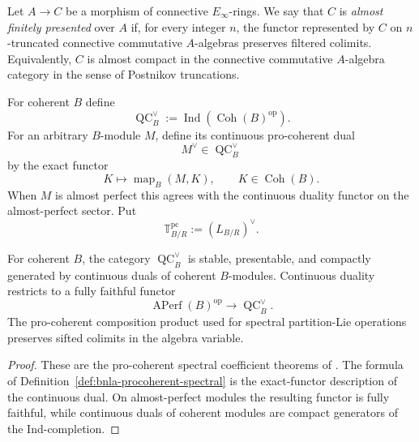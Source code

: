 \begin{definition}
\label{def:bnla-spectral-almost-finite-presentation}
Let $A\to C$ be a morphism of connective $E_\infty$-rings.  We say that
$C$ is \emph{almost finitely presented} over $A$ if, for every integer $n$,
the functor represented by $C$ on $n$-truncated connective commutative
$A$-algebras preserves filtered colimits.  Equivalently, $C$ is almost
compact in the connective commutative $A$-algebra category in the sense of
Postnikov truncations.  \end{definition}

\begin{definition}
\label{def:bnla-procoherent-spectral}
For coherent $B$ define
\[
    \operatorname{QC}^{\vee}_B
    :=
    \operatorname{Ind}
    \left(
        \operatorname{Coh}(B)^{\mathrm{op}}
    \right).
\]
For an arbitrary $B$-module $M$, define its continuous pro-coherent dual
\[
    M^\vee\in\operatorname{QC}^{\vee}_B
\]
by the exact functor
\[
    K\longmapsto
    \operatorname{map}_{B}(M,K),
    \qquad
    K\in\operatorname{Coh}(B).
\]
When $M$ is almost perfect this agrees with the continuous duality functor on
the almost-perfect sector.  Put
\[
    \mathbb T^{\mathrm{pc}}_{B/R}
    :=
    \left(L_{B/R}\right)^\vee.
\]
\end{definition}

\begin{proposition}
\label{prop:bnla-procoherent-properties}
For coherent $B$, the category $\operatorname{QC}^{\vee}_B$ is stable,
presentable, and compactly generated by continuous duals of coherent
$B$-modules.  Continuous duality restricts to a fully faithful functor
\[
    \operatorname{APerf}(B)^{\mathrm{op}}
    \longrightarrow
    \operatorname{QC}^{\vee}_B.
\]
The pro-coherent composition product used for spectral partition-Lie
operations preserves sifted colimits in the algebra variable.
\end{proposition}

\begin{proof}
These are the pro-coherent spectral coefficient theorems of
\cite{BrantnerCamposNuiten2025}.  The formula of
Definition~\ref{def:bnla-procoherent-spectral} is the exact-functor
description of the continuous dual.  On almost-perfect modules the resulting
functor is fully faithful, while continuous duals of coherent modules are
compact generators of the Ind-completion.
\end{proof}

